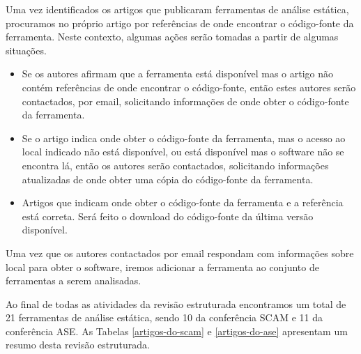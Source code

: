 Uma vez identificados os artigos que publicaram ferramentas de análise
estática, procuramos no próprio artigo por referências de onde encontrar o
código-fonte da ferramenta. Neste contexto, algumas ações serão tomadas a
partir de algumas situações.

\begin{itemize}

  \item Se os autores afirmam que a ferramenta está disponível mas o artigo
    não contém referências de onde encontrar o código-fonte, então estes
    autores serão contactados, por email, solicitando informações de onde
    obter o código-fonte da ferramenta.

  \item Se o artigo indica onde obter o código-fonte da ferramenta, mas o acesso ao local
    indicado não está disponível, ou está disponível mas o software não se
    encontra lá, então os autores serão contactados, solicitando informações
    atualizadas de onde obter uma cópia do código-fonte da ferramenta.

  \item Artigos que indicam onde obter o código-fonte da ferramenta e a referência
    está correta. Será feito o download do código-fonte da última versão
    disponível.

\end{itemize}

Uma vez que os autores contactados por email respondam com informações sobre
local para obter o software, iremos adicionar a ferramenta ao conjunto de ferramentas
a serem analisadas.

Ao final de todas as atividades da revisão estruturada encontramos um total de
21 ferramentas de análise estática, sendo 10 da conferência SCAM e 11 da
conferência ASE. As Tabelas \ref{artigos-do-scam} e \ref{artigos-do-ase}
apresentam um resumo desta revisão estruturada.

